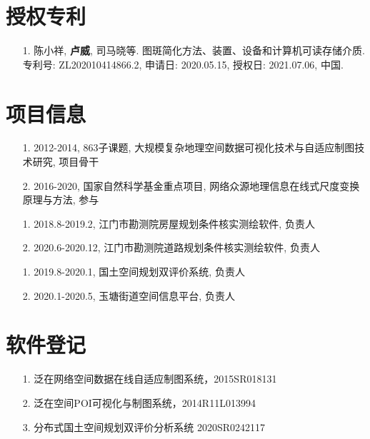 \documentclass{resume}
\begin{document}
\section{授权专利}
\begin{itemize}[parsep=1.0ex]
  \item[1.] 陈小祥, \textbf{卢威}, 司马晓等. 图斑简化方法、装置、设备和计算机可读存储介质. 专利号: ZL202010414866.2, 申请日: 2020.05.15, 授权日: 2021.07.06, 中国.
\end{itemize}

\section{项目信息}
\begin{itemize}[parsep=1.0ex]
  \item[1.] 2012-2014, 863子课题, 大规模复杂地理空间数据可视化技术与自适应制图技术研究, 项目骨干
  \item[2.] 2016-2020, 国家自然科学基金重点项目, 网络众源地理信息在线式尺度变换原理与方法, 参与
\end{itemize}

\begin{itemize}[parsep=1.0ex]
  \item[1.] 2018.8-2019.2, 江门市勘测院房屋规划条件核实测绘软件, 负责人
  \item[2.] 2020.6-2020.12, 江门市勘测院道路规划条件核实测绘软件, 负责人
\end{itemize}

\begin{itemize}[parsep=1.0ex]
  \item[1.] 2019.8-2020.1, 国土空间规划双评价系统, 负责人
  \item[2.] 2020.1-2020.5, 玉塘街道空间信息平台, 负责人
\end{itemize}

\section{软件登记}
\begin{itemize}[parsep=1.0ex]
  \item[1.] 泛在网络空间数据在线自适应制图系统，2015SR018131
  \item[2.] 泛在空间POI可视化与制图系统，2014R11L013994
  \item[3.] 分布式国土空间规划双评价分析系统 2020SR0242117
\end{itemize}
\end{document}
